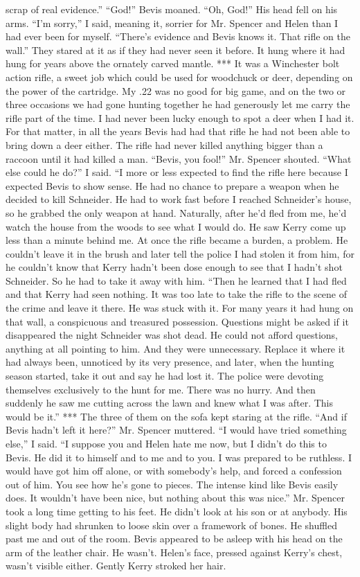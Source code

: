 \documentclass{novel}
\begin{document}
scrap of real evidence.” “God!” Bevis moaned. “Oh, God!” His head fell on his arms. “I’m sorry,” I said, meaning it, sorrier for Mr. Spencer and Helen than I had ever been for myself. “There’s evidence and Bevis knows it. That rifle on the wall.” They stared at it as if they had never seen it before. It hung where it had hung for years above the ornately carved mantle. *** It was a Winchester bolt action rifle, a sweet job which could be used for woodchuck or deer, depending on the power of the cartridge. My .22 was no good for big game, and on the two or three occasions we had gone hunting together he had generously let me carry the rifle part of the time. I had never been lucky enough to spot a deer when I had it. For that matter, in all the years Bevis had had that rifle he had not been able to bring down a deer either. The rifle had never killed anything bigger than a raccoon until it had killed a man. “Bevis, you fool!” Mr. Spencer shouted. “What else could he do?” I said. “I more or less expected to find the rifle here because I expected Bevis to show sense. He had no chance to prepare a weapon when he decided to kill Schneider. He had to work fast before I reached Schneider’s house, so he grabbed the only weapon at hand. Naturally, after he’d fled from me, he’d watch the house from the woods to see what I would do. He saw Kerry come up less than a minute behind me. At once the rifle became a burden, a problem. He couldn’t leave it in the brush and later tell the police I had stolen it from him, for he couldn’t know that Kerry hadn’t been dose enough to see that I hadn’t shot Schneider. So he had to take it away with him. “Then he learned that I had fled and that Kerry had seen nothing. It was too late to take the rifle to the scene of the crime and leave it there. He was stuck with it. For many years it had hung on that wall, a conspicuous and treasured possession. Questions might be asked if it disappeared the night Schneider was shot dead. He could not afford questions, anything at all pointing to him. And they were unnecessary. Replace it where it had always been, unnoticed by its very presence, and later, when the hunting season started, take it out and say he had lost it. The police were devoting themselves exclusively to the hunt for me. There was no hurry. And then suddenly he saw me cutting across the lawn and knew what I was after. This would be it.” *** The three of them on the sofa kept staring at the rifle. “And if Bevis hadn’t left it here?” Mr. Spencer muttered. “I would have tried something else,” I said. “I suppose you and Helen hate me now, but I didn’t do this to Bevis. He did it to himself and to me and to you. I was prepared to be ruthless. I would have got him off alone, or with somebody’s help, and forced a confession out of him. You see how he’s gone to pieces. The intense kind like Bevis easily does. It wouldn’t have been nice, but nothing about this was nice.” Mr. Spencer took a long time getting to his feet. He didn’t look at his son or at anybody. His slight body had shrunken to loose skin over a framework of bones. He shuffled past me and out of the room. Bevis appeared to be asleep with his head on the arm of the leather chair. He wasn’t. Helen’s face, pressed against Kerry’s chest, wasn’t visible either. Gently Kerry stroked her hair. 
\end{document}
